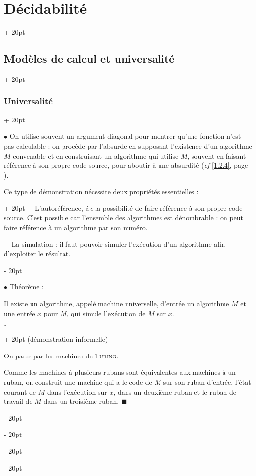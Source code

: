 \documentclass[a4paper, 12pt, twoside]{article}
\newcommand{\ind}[1][20pt]{\advance\leftskip + #1}
\newcommand{\deind}[1][20pt]{\advance\leftskip - #1}
\newenvironment{indt}[2][20pt]{#2 \par \ind[#1]}{\par \deind} %
\newenvironment{proof}[1][{}]{\begin{indt}{$\square$ #1}}{$\blacksquare$ \end{indt}}
\begin{document}
\begin{indt}{\section{Décidabilité}}
\begin{indt}{\subsection{Modèles de calcul et universalité}}
            \begin{indt}{\subsubsection{Universalité}}
                \label{1.1.5}

                $\bullet$ On utilise souvent un argument diagonal pour montrer qu'une fonction n'est pas calculable : on procède par l'absurde en supposant l'existence d'un algorithme $M$ convenable et en construisant un algorithme qui utilise $M$, souvent en faisant référence à son propre code source, pour aboutir à une absurdité (\textit{cf} \ref{1.2.4}, page \pageref{1.2.4}).

                \begin{indt}{Ce type de démonstration nécessite deux propriétés essentielles :}
                    $-$ L'autoréférence, \textit{i.e} la possibilité de faire référence à son propre code source. C'est possible car l'ensemble des algorithmes est dénombrable : on peut faire référence à un algorithme par son numéro.

                    $-$ La simulation : il faut pouvoir simuler l'exécution d'un algorithme afin d'exploiter le résultat.
                \end{indt}

                \vspace{12pt}
                
                $\bullet$ Théorème :
                \begin{emphBox}
                    Il existe un algorithme, appelé machine universelle, d'entrée un algorithme $M$ et une entrée $x$ pour $M$, qui simule l'exécution de $M$ sur $x$.
                \end{emphBox}

                \begin{proof}
                    (démonstration informelle)

                    On passe par les machines de \textsc{Turing}.

                    Comme les machines à plusieurs rubans sont équivalentes aux machines à un ruban, on construit une machine qui a le code de $M$ sur son ruban d'entrée, l'état courant de $M$ dans l'exécution sur $x$, dans un deuxième ruban et le ruban de travail de $M$ dans un troisième ruban.
                \end{proof}
            \end{indt}
        \end{indt}


\end{indt}
\end{document}
